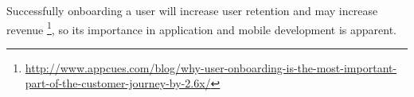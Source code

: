 Successfully onboarding a user will increase user retention and may increase revenue \footnote{\url{http://www.appcues.com/blog/why-user-onboarding-is-the-most-important-part-of-the-customer-journey-by-2.6x/}}, so its importance in application and mobile development is apparent.











